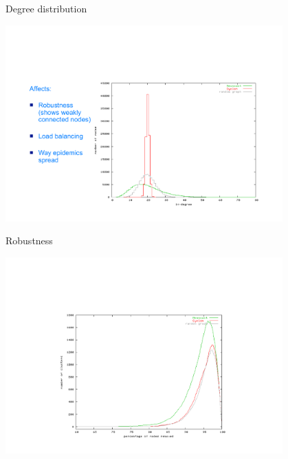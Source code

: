 \begin{frame}{Degree distribution}
	
\begin{center}
\includegraphics[width=0.8\textwidth]{degree}	
\end{center}



	
\end{frame}

\begin{frame}{Robustness}
	
\begin{center}
\includegraphics[width=0.8\textwidth]{robustness}	
\end{center}

\end{frame}

